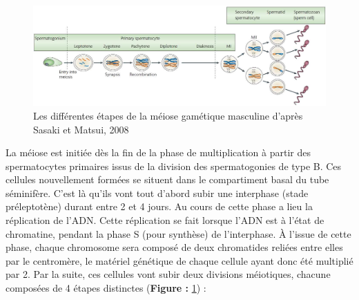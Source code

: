 \documentclass[12pt,twoside]{reedthesis}
\theoremstyle{definition}
\theoremstyle{definition}
\theoremstyle{remark}
\begin{document}
  \begin{figure}
  
  {\centering \includegraphics[scale=0.33]{figure/Meiosis_Stages} 
  
  }
  
  \caption[Les différentes étapes de la méiose gamétique masculine]{Les différentes étapes de la méiose gamétique masculine d'après Sasaki et Matsui, 2008}\label{fig:meiose}
  \end{figure}
  
  La méiose est initiée dès la fin de la phase de multiplication à partir
  des spermatocytes primaires issus de la division des spermatogonies de
  type B. Ces cellules nouvellement formées se situent dans le
  compartiment basal du tube séminifère. C'est là qu'ils vont tout d'abord
  subir une interphase (stade préleptotène) durant entre 2 et 4 jours. Au
  cours de cette phase a lieu la réplication de l'ADN. Cette réplication
  se fait lorsque l'ADN est à l'état de chromatine, pendant la phase S
  (pour synthèse) de l'interphase. À l'issue de cette phase, chaque
  chromosome sera composé de deux chromatides reliées entre elles par le
  centromère, le matériel génétique de chaque cellule ayant donc été
  multiplié par 2. Par la suite, ces cellules vont subir deux divisions
  méiotiques, chacune composées de 4 étapes distinctes (\textbf{Figure :
  }\ref{fig:meiose}) :
  
\end{document}
